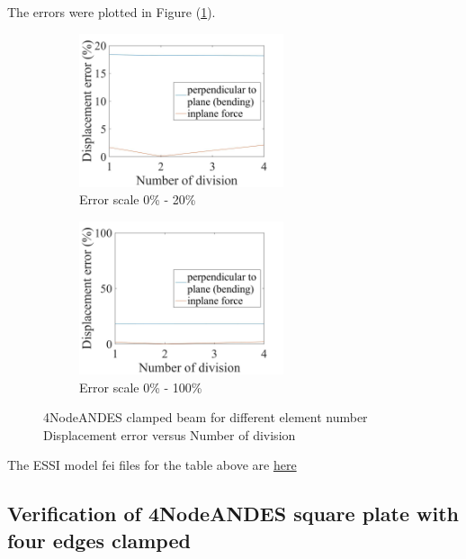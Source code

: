\documentclass[fleqn,11pt,letter]{article}
\begin{document}
The errors were plotted in Figure (\ref{fig error 4NodeANDES clamped beam for different element number}).

\begin{figure}[H]
  \begin{subfigure}{0.5\textwidth}
    \centering
    \includegraphics[width=6cm]{../Figure_files/4NodeANDES/error4andes_clamped_beam_diff_element.jpeg}
    \caption{Error scale 0\% - 20\%}
  \end{subfigure}
  \begin{subfigure}{0.5\textwidth}
    \centering
    \includegraphics[width=6cm]{../Figure_files/4NodeANDES/error4andes_clamped_beam_diff_element100.jpeg}
    \caption{Error scale 0\% - 100\%}
  \end{subfigure}
  \captionsetup{justification=centering,margin=2cm}
  \caption{4NodeANDES clamped beam for different element number\\
      Displacement error   versus   Number of division}
  \label{fig error 4NodeANDES clamped beam for different element number}
\end{figure}


The ESSI model fei files for the table above are \href{https://github.com/yuan-energy/ESSI_Verification/blob/master/4NodeANDES/clamped_beam_cut/clamped_beam_cut.tar.gz?raw=true}{here}







\newpage
\subsection{Verification of 4NodeANDES square plate with four edges clamped}
\end{document}

